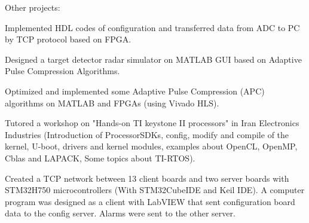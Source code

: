{}


\begin{cventries}

  \cventry
    {} %
    {Other projects:} %
    {} %
    {} %
    {
      \begin{cvitems} %
        \item {Implemented HDL codes of configuration and transferred data from ADC to PC by TCP protocol based on FPGA.}
        \item {Designed a target detector radar simulator on MATLAB GUI based on Adaptive Pulse Compression Algorithms.}
        \item {Optimized and implemented some Adaptive Pulse Compression (APC) algorithms on MATLAB and FPGAs (using Vivado HLS).}
	      \item {Tutored a workshop on "Hands-on TI keystone II processors" in Iran Electronics Industries (Introduction of ProcessorSDKs, config, modify and compile of the kernel, U-boot, drivers and kernel modules, examples about OpenCL, OpenMP, Cblas and LAPACK, Some topics about TI-RTOS).}
	      \item {Created a TCP network between 13 client boards and two server boards with STM32H750 microcontrollers (With STM32CubeIDE and Keil IDE). A computer program was designed as a client with LabVIEW that sent configuration board data to the config server. Alarms were sent to the other server.}
      \end{cvitems}
    }

\end{cventries}
